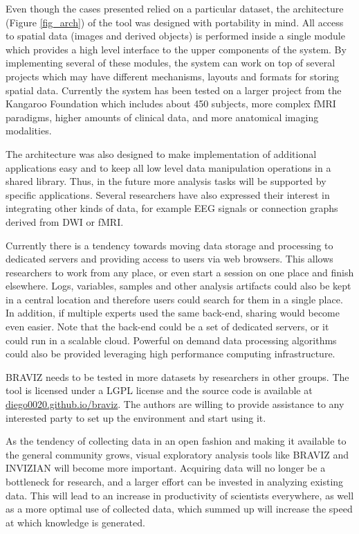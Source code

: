 \documentclass[twocolumn]{svjour3}
\begin{document}
Even though the cases presented relied on a particular dataset, the architecture (Figure \ref{fig_arch}) of the tool was designed with portability in mind. All access to spatial data (images and derived objects) is performed inside a single module which provides a high level interface to the upper components of the system. By implementing several of these modules, the system can work on top of several projects which may have different mechanisms, layouts and formats for storing spatial data. Currently the system has been tested on a larger project from the Kangaroo Foundation which includes about 450 subjects, more complex fMRI paradigms, higher amounts of clinical data, and more anatomical imaging modalities.  

The architecture was also designed to make implementation of additional applications easy and to keep all low level data manipulation operations in a shared library. Thus, in the future more analysis tasks will be supported by specific applications. Several researchers have also expressed their interest in integrating other kinds of data, for example EEG signals or connection graphs \cite{rubinov_complex_2010} derived from DWI or fMRI. 

Currently there is a tendency towards moving data storage and processing to dedicated servers and providing access to users via web browsers. This allows researchers to work from any place, or even start a session on one place and finish elsewhere. Logs, variables, samples and other analysis artifacts could also be kept in a central location and therefore users could search for them in a single place. In addition, if multiple experts used the same back-end, sharing would become even easier. Note that the back-end could be a set of dedicated servers, or it could run in a scalable cloud. Powerful on demand data processing algorithms could also be provided leveraging high performance computing infrastructure. 

BRAVIZ needs to be tested in more datasets by researchers in other groups. The tool is licensed under a LGPL license and the source code is available at \url{diego0020.github.io/braviz}. The authors are willing to provide assistance to any interested party to set up the environment and start using it. 

As the tendency of collecting data in an open fashion and making it available to the general community grows, visual exploratory analysis tools like BRAVIZ and INVIZIAN will become more important. Acquiring data will no longer be a bottleneck for research, and a larger effort can be invested in analyzing existing data. This will lead to an increase in productivity of scientists everywhere, as well as a more optimal use of collected data, which summed up will increase the speed at which knowledge is generated.
\end{document}
